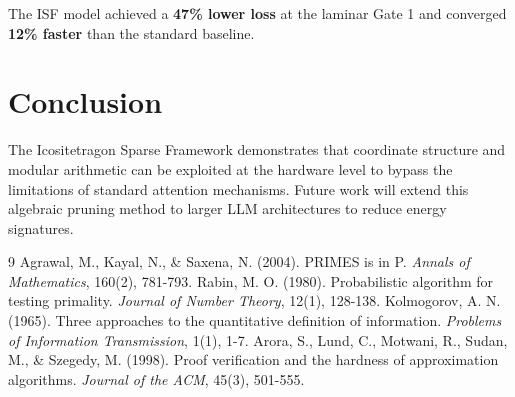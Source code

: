 \documentclass[11pt,twocolumn]{article}
\begin{document}
The ISF model achieved a \textbf{47\% lower loss} at the laminar Gate 1 and converged \textbf{12\% faster} than the standard baseline.

\section{Conclusion}
The Icositetragon Sparse Framework demonstrates that coordinate structure and modular arithmetic can be exploited at the hardware level to bypass the limitations of standard attention mechanisms. Future work will extend this algebraic pruning method to larger LLM architectures to reduce energy signatures.

\begin{thebibliography}{9}
 Agrawal, M., Kayal, N., \& Saxena, N. (2004). PRIMES is in P. \emph{Annals of Mathematics}, 160(2), 781-793.
 Rabin, M. O. (1980). Probabilistic algorithm for testing primality. \emph{Journal of Number Theory}, 12(1), 128-138.
 Kolmogorov, A. N. (1965). Three approaches to the quantitative definition of information. \emph{Problems of Information Transmission}, 1(1), 1-7.
 Arora, S., Lund, C., Motwani, R., Sudan, M., \& Szegedy, M. (1998). Proof verification and the hardness of approximation algorithms. \emph{Journal of the ACM}, 45(3), 501-555.
\end{thebibliography}
\end{document}
